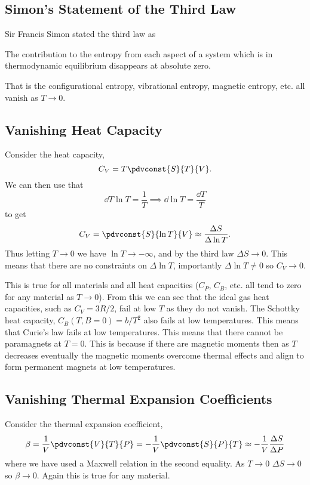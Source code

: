     \subsection{Simon's Statement of the Third Law}
    Sir Francis Simon stated the third law as
    \begin{displayquote}[--F. Simon]
        The contribution to the entropy from each aspect of a system which is in thermodynamic equilibrium disappears at absolute zero.
    \end{displayquote}
    That is the configurational entropy, vibrational entropy, magnetic entropy, etc. all vanish as \(T \to 0\).
    
    \subsection{Vanishing Heat Capacity}
    Consider the heat capacity,
    \[C_V = T\pdvconst{S}{T}{V}.\]
    We can then use that
    \[\dd{T}\ln T = \frac{1}{T} \implies \dd{\ln T} = \frac{\dd{T}}{T}\]
    to get
    \[C_V = \pdvconst{S}{\ln T}{V} \approx \frac{\Delta S}{\Delta \ln T}.\]
    Thus letting \(T\to 0\) we have \(\ln T \to -\infty\), and by the third law \(\Delta S \to 0\).
    This means that there are no constraints on \(\Delta \ln T\), importantly \(\Delta \ln T \ne 0\) so \(C_V \to 0\).
    
    This is true for all materials and all heat capacities (\(C_P\), \(C_B\), etc. all tend to zero for any material as \(T \to 0\)).
    From this we can see that the ideal gas heat capacities, such as \(C_V = 3R/2\), fail at low \(T\) as they do not vanish.
    The Schottky heat capacity, \(C_B(T, B = 0) = b/T^2\) also fails at low temperatures.
    This means that Curie's law fails at low temperatures.
    This means that there cannot be paramagnets at \(T = 0\).
    This is because if there are magnetic moments then as \(T\) decreases eventually the magnetic moments overcome thermal effects and align to form permanent magnets at low temperatures.
    
    \subsection{Vanishing Thermal Expansion Coefficients}
    Consider the thermal expansion coefficient,
    \[\beta = \frac{1}{V}\pdvconst{V}{T}{P} = -\frac{1}{V}\pdvconst{S}{P}{T} \approx -\frac{1}{V}\frac{\Delta S}{\Delta P}\]
    where we have used a Maxwell relation in the second equality.
    As \(T\to 0\) \(\Delta S \to 0\) so \(\beta\to 0\).
    Again this is true for any material.
    
